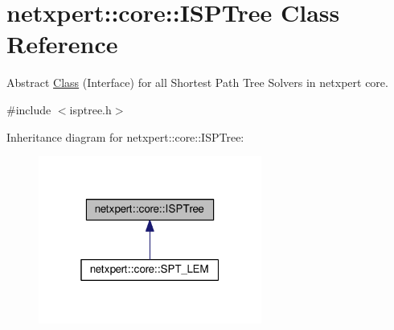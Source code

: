 \hypertarget{classnetxpert_1_1core_1_1ISPTree}{}\section{netxpert\+:\+:core\+:\+:I\+S\+P\+Tree Class Reference}
\label{classnetxpert_1_1core_1_1ISPTree}


Abstract \hyperlink{classClass}{Class} (Interface) for all Shortest Path Tree Solvers in netxpert core.  




{\ttfamily \#include $<$isptree.\+h$>$}



Inheritance diagram for netxpert\+:\+:core\+:\+:I\+S\+P\+Tree\+:\nopagebreak
\begin{figure}[H]
\begin{center}
\leavevmode
\includegraphics[width=208pt]{classnetxpert_1_1core_1_1ISPTree__inherit__graph}
\end{center}
\end{figure}
